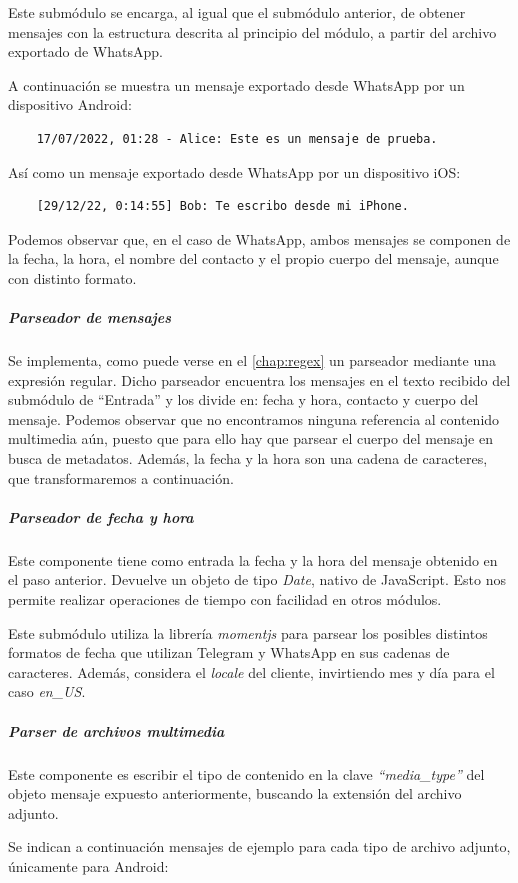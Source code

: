 Este submódulo se encarga, al igual que el submódulo anterior, de obtener mensajes con la estructura descrita al principio del módulo, a partir del archivo exportado de WhatsApp.

A continuación se muestra un mensaje exportado desde WhatsApp por un dispositivo Android:

\begin{lstlisting}
	17/07/2022, 01:28 - Alice: Este es un mensaje de prueba.
\end{lstlisting}

Así como un mensaje exportado desde WhatsApp por un dispositivo iOS:

\begin{lstlisting}
	[29/12/22, 0:14:55] Bob: Te escribo desde mi iPhone.
\end{lstlisting}

Podemos observar que, en el caso de WhatsApp, ambos mensajes se componen de la fecha, la hora, el nombre del contacto y el propio cuerpo del mensaje, aunque con distinto formato.

\subparagraph{Parseador de mensajes} Se implementa, como puede verse en el \autoref{chap:regex} un parseador mediante una expresión regular. Dicho parseador encuentra los mensajes en el texto recibido del submódulo de ``Entrada'' y los divide en: fecha y hora, contacto y cuerpo del mensaje. Podemos observar que no encontramos ninguna referencia al contenido multimedia aún, puesto que para ello hay que parsear el cuerpo del mensaje en busca de metadatos. Además, la fecha y la hora son una cadena de caracteres, que transformaremos a continuación.

\subparagraph{Parseador de fecha y hora} Este componente tiene como entrada la fecha y la hora del mensaje obtenido en el paso anterior. Devuelve un objeto de tipo \textit{Date}, nativo de JavaScript. Esto nos permite realizar operaciones de tiempo con facilidad en otros módulos.

Este submódulo utiliza la librería \textit{momentjs} para parsear los posibles distintos formatos de fecha que utilizan Telegram y WhatsApp en sus cadenas de caracteres. Además, considera el \textit{locale} del cliente, invirtiendo mes y día para el caso \textit{en\_US}.

\subparagraph{Parser de archivos multimedia} Este componente es escribir el tipo de contenido en la clave \textit{``media\_type''} del objeto mensaje expuesto anteriormente, buscando la extensión del archivo adjunto.

Se indican a continuación mensajes de ejemplo para cada tipo de archivo adjunto, únicamente para Android:

